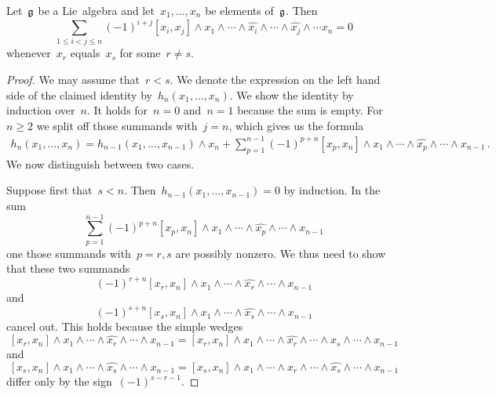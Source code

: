 \begin{lemma}
  \label{alternating in multiple arguments}
  Let~$\mathfrak{g}$ be a Lie~algebra and let~$x_1, \dotsc, x_n$ be elements of~$\mathfrak{g}$.
  Then
  \[
    \sum_{1 \leq i < j \leq n}
    (-1)^{i+j}
    [x_i, x_j] \wedge x_1 \wedge \dotsb \wedge \widehat{x_i} \wedge \dotsb \wedge \widehat{x_j} \wedge \dotsb x_n
    =
    0
  \]
  whenever~$x_r$ equals~$x_s$ for some~$r \neq s$.
\end{lemma}


\begin{proof}
  We may assume that~$r < s$.
  We denote the expression on the left hand side of the claimed identity by~$h_n(x_1, \dotsc, x_n)$.
  We show the identity by induction over~$n$.
  It holds for~$n = 0$ and~$n = 1$ because the sum is empty.
  For~$n \geq 2$ we split off those summands with~$j = n$, which gives us the formula
  \begin{align*}
    h_n(x_1, \dotsc, x_n)
    =
    h_{n-1}(x_1, \dotsc, x_{n-1}) \wedge x_n
    +
    \sum_{p=1}^{n-1}
    (-1)^{p+n}
    [x_p, x_n] \wedge x_1 \wedge \dotsb \wedge \widehat{x_p} \wedge \dotsb \wedge x_{n-1} \,.
  \end{align*}
  We now distinguish between two cases.

  Suppose first that~$s < n$.
  Then~$h_{n-1}(x_1, \dotsc, x_{n-1}) = 0$ by induction.
  In the sum
  \[
    \sum_{p=1}^{n-1}
    (-1)^{p+n}
    [x_p, x_n] \wedge x_1 \wedge \dotsb \wedge \widehat{x_p} \wedge \dotsb \wedge x_{n-1}
  \]
  one those summands with~$p = r, s$ are possibly nonzero.
  We thus need to show that these two summands
  \[
    (-1)^{r+n}
    [x_r, x_n] \wedge x_1 \wedge \dotsb \wedge \widehat{x_r} \wedge \dotsb \wedge x_{n-1}
  \]
  and
  \[
    (-1)^{s+n}
    [x_s, x_n] \wedge x_1 \wedge \dotsb \wedge \widehat{x_s} \wedge \dotsb \wedge x_{n-1}
  \]
  cancel out.
  This holds because the simple wedges
  \[
    [x_r, x_n] \wedge x_1 \wedge \dotsb \wedge \widehat{x_r} \wedge \dotsb \wedge x_{n-1}
    =
    [x_r, x_n] \wedge x_1 \wedge \dotsb \wedge \widehat{x_r} \wedge \dotsb \wedge x_s \wedge \dotsb \wedge x_{n-1}
  \]
  and
  \[
    [x_s, x_n] \wedge x_1 \wedge \dotsb \wedge \widehat{x_s} \wedge \dotsb \wedge x_{n-1}
    =
    [x_s, x_n] \wedge x_1 \wedge \dotsb \wedge x_r \wedge \dotsb \wedge \widehat{x_s} \wedge \dotsb \wedge x_{n-1}
  \]
  differ only by the sign~$(-1)^{s-r-1}$.


\end{proof}

